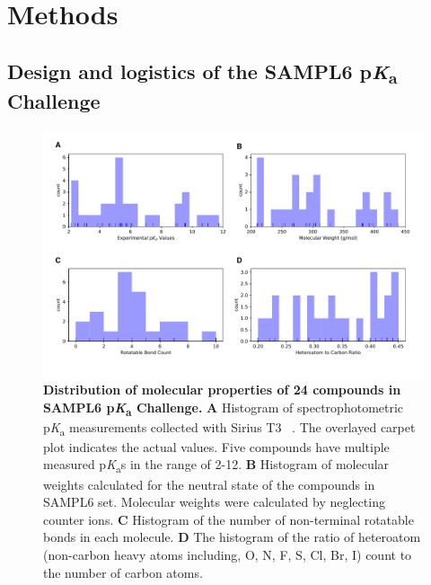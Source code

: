 \documentclass[9pt,lineno,final]{elife}
\newcommand{\pKa}{p\textit{K}\textsubscript{a}}
\begin{document}
\section{Methods}

\subsection{Design and logistics of the SAMPL6 \pKa{} Challenge}

\begin{figure}
\begin{center}
\includegraphics[width=1.0\linewidth]{figures/distribution_of_molecular_properties.pdf}
\caption{{\bf Distribution of molecular properties of 24 compounds in SAMPL6 \pKa{} Challenge.} {\bf A} Histogram of spectrophotometric \pKa{} measurements collected with Sirius T3 ~\cite{Isik:2018:J.Comput.AidedMol.Des.}. The overlayed carpet plot indicates the actual values. Five compounds have multiple measured \pKa{}s in the range of 2-12. {\bf B} Histogram of molecular weights calculated for the neutral state of the compounds in SAMPL6 set. Molecular weights were calculated by neglecting counter ions.  {\bf C} Histogram of the number of non-terminal rotatable bonds in each molecule. {\bf D} The histogram of the ratio of heteroatom (non-carbon heavy atoms including, O, N, F, S, Cl, Br, I) count to the number of carbon atoms.
}
\label{fig:dist_mol_prop}
\end{center}
\end{figure}
\end{document}

